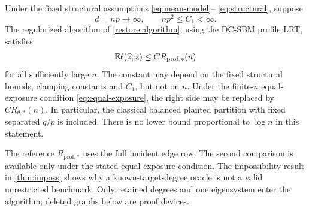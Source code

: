 \begin{theorem}\label{restore:dc-theorem}\label{thm:regularized}
Under the fixed structural assumptions \eqref{eq:mean-model}--%
\eqref{eq:structural}, suppose
\[
 d=np\longrightarrow\infty,\qquad np^2\le C_1<\infty.
\]
The regularized algorithm of \cref{restore:algorithm}, using the
DC-SBM profile LRT, satisfies
\[
 \mathbb E\ell(\widehat z,z)\le C R_{\mathrm{prof},*}(n)
\]
for all sufficiently large $n$. The constant may depend on the fixed
structural bounds, clamping constants and $C_1$, but not on $n$.
Under the finite-$n$ equal-exposure condition
\eqref{eq:equal-exposure}, the right side may be replaced by
$C R_{\theta,*}(n)$. In particular, the classical balanced planted
partition with fixed separated $q/p$ is included. There is no lower
bound proportional to $\log n$ in this statement.
\end{theorem}


The reference $R_{\mathrm{prof},*}$ uses the full incident edge row.
The second comparison is available only under the stated equal-exposure
condition. The impossibility result in \cref{thm:imposs} shows why a
known-target-degree oracle is not a valid unrestricted benchmark.
Only retained degrees and one eigensystem enter the algorithm;
deleted graphs below are proof devices.
